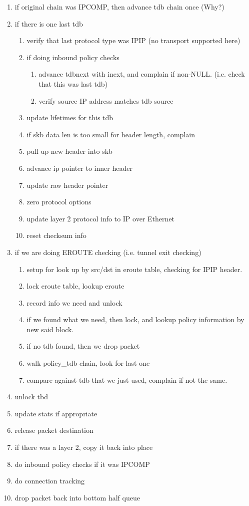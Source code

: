 \begin{enumerate}
	\item if original chain was IPCOMP, then advance tdb chain once (Why?)
	\item if there is one last tdb
	\begin{enumerate}
		\item verify that last protocol type was IPIP (no transport
			supported here)
		\item if doing inbound policy checks
		\begin{enumerate}
			\item advance tdbnext with inext, and complain if
				non-NULL. (i.e. check that this was last tdb)
			\item verify source IP address matches tdb source
		\end{enumerate}
		\item update lifetimes for this tdb
		\item if skb data len is too small for header length,
			complain
		\item pull up new header into skb
		\item advance ip pointer to inner header
		\item update raw header pointer
		\item zero protocol options
		\item update layer 2 protocol info to IP over Ethernet
		\item reset checksum info
	\end{enumerate}
	\item if we are doing EROUTE checking (i.e. tunnel exit checking)
	\begin{enumerate}
		\item setup for look up by src/dst in eroute table, checking
			for IPIP header.
		\item lock eroute table, lookup eroute
		\item record info we need and unlock
		\item if we found what we need, then lock, and lookup policy
			information by new said block.
		\item if no tdb found, then we drop packet
		\item walk policy\_tdb chain, look for last one
		\item compare against tdb that we just used, complain if not
			the same.	
	\end{enumerate}
	\item unlock tbd
	\item update stats if appropriate
	\item release packet destination 
	\item if there was a layer 2, copy it back into place
	\item do inbound policy checks if it was IPCOMP 
	\item do connection tracking
	\item drop packet back into bottom half queue
\end{enumerate}

